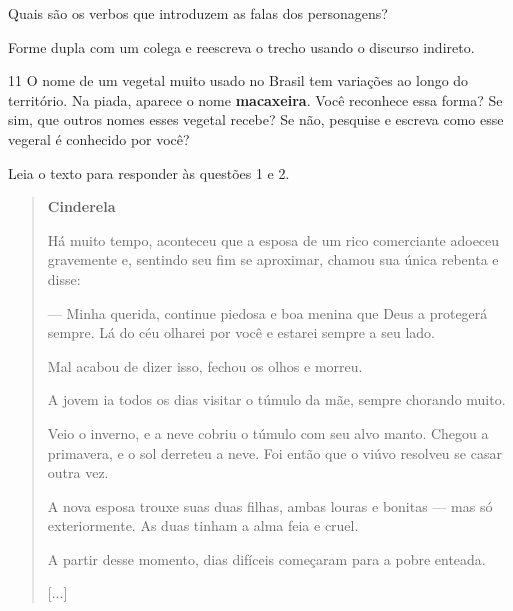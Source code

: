 \begin{escolha}
\item Quais são os verbos que introduzem as falas dos personagens? 



\item Forme dupla com um colega e reescreva o trecho usando o discurso
indireto.

\end{escolha}

\num{11} O nome de um vegetal muito usado no Brasil tem variações ao longo do território.
Na piada, aparece o nome \textbf{macaxeira}. Você reconhece essa forma? Se sim, que outros
nomes esses vegetal recebe? Se não, pesquise e escreva como esse vegeral é conhecido por
você?



Leia o texto para responder às questões 1 e 2.

\begin{quote}
\textbf{Cinderela}

Há muito tempo, aconteceu que a esposa de um rico
comerciante adoeceu gravemente e, sentindo seu fim se
aproximar, chamou sua única rebenta e disse:

--- Minha querida, continue piedosa e boa menina que
Deus a protegerá sempre. Lá do céu olharei por você e estarei
sempre a seu lado.

Mal acabou de dizer isso, fechou os olhos e morreu.

A jovem ia todos os dias visitar o túmulo da mãe,
sempre chorando muito.

Veio o inverno, e a neve cobriu o túmulo com seu alvo
manto. Chegou a primavera, e o sol derreteu a neve. Foi então
que o viúvo resolveu se casar outra vez.

A nova esposa trouxe suas duas filhas, ambas louras e
bonitas --- mas só exteriormente. As duas tinham a alma feia
e cruel.

A partir desse momento, dias difíceis começaram para
a pobre enteada.

{[}...{]}

\end{quote}

